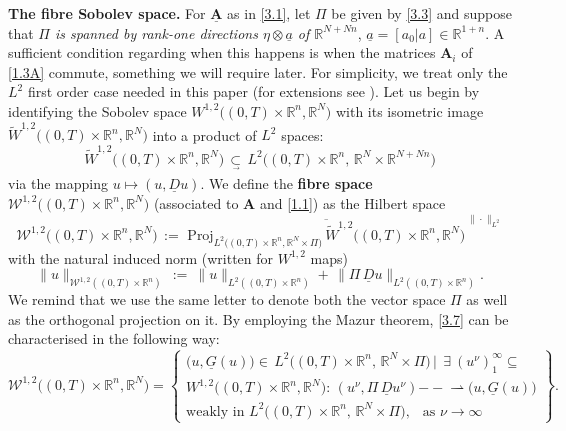 \documentclass{amsart}
\theoremstyle{definition}
\numberwithin{equation}{section}
\begin{document}
{\noindent} \textbf{The fibre Sobolev space.}  For ${\underline{\textbf{A}}}$ as in \eqref{3.1}, let $\Pi$ be given by \eqref{3.3} and suppose that \emph{$\Pi$ is spanned by rank-one directions $\eta {\otimes} \underline{a}$ of ${\mathbb{R}}^{N +Nn}$}, $\underline{a}=[a_0|a]\in {\mathbb{R}}^{1+n}$. A sufficient condition regarding when this happens is when the matrices ${\textbf{A}}_i$ of \eqref{1.3A} commute, something we will require later. For simplicity, we treat only the $L^2$ first order case needed in this paper (for extensions see \cite{K8}). Let us begin by identifying the Sobolev space $W^{1,2}\big((0,T)\!{\times}\! {\mathbb{R}}^n,{\mathbb{R}}^N\big)$ with its isometric image $\tilde{W}^{1,2}\big((0,T)\!{\times}\! {\mathbb{R}}^n,{\mathbb{R}}^N\big)$ into a product of $L^2$ spaces:
\[
\tilde{W}^{1,2}\Big((0,T)\!{\times}\! {\mathbb{R}}^n,{\mathbb{R}}^N\Big)\, \underset{\, ^{\rightarrow}}{\subset} \, L^2\Big((0,T)\!{\times}\! {\mathbb{R}}^n,\, {\mathbb{R}}^N \! {\times} {\mathbb{R}}^{N+Nn}\Big)
\]
via the mapping $u\mapsto(u,{\underline{D}} u)$. We define the \textbf{fibre space} $\mathscr{W}^{1,2}\big( (0,T)\!{\times}\! {\mathbb{R}}^n,{\mathbb{R}}^N \big)$ (associated to ${\textbf{A}}$ and \eqref{1.1}) as the Hilbert space
\begin{equation} \label{3.7}
\mathscr{W}^{1,2} \Big((0,T)\!{\times}{\mathbb{R}}^n,{\mathbb{R}}^N\Big)\, :=\, \overline{\, \text{Proj}_{ L^2\big((0,T){\times}  {\mathbb{R}}^n,{\mathbb{R}}^N {\times} \Pi \big) }\,  \tilde{W}^{1,2} \Big((0,T)\!{\times}{\mathbb{R}}^n,{\mathbb{R}}^N\Big) \, }^{\|\cdot\|_{ L^2} }
\end{equation}
with the natural induced norm (written for $W^{1,2}$ maps)
\[
\|u\|_{\mathscr{W}^{1,2}((0,T){\times} {\mathbb{R}}^n )} \, :=\ \|u \|_{L^2((0,T){\times} {\mathbb{R}}^n)}+\, \big\|\Pi\, {\underline{D}} u \big\|_{L^2((0,T){\times}{\mathbb{R}}^n)}.
\]
We remind that we use the same letter to denote both the vector space $\Pi$ as well as the orthogonal projection on it. By employing the Mazur theorem,  \eqref{3.7} can be characterised in the following way:
\[
\mathscr{W}^{1,2}  \Big((0,T) {\times} {\mathbb{R}}^n,{\mathbb{R}}^N\Big) = \left\{ 
\begin{array}{l}
 \big(u,  \underline{G}  (u)\big) \in\, L^2\Big( (0,T)\!{\times}\! {\mathbb{R}}^n,\, {\mathbb{R}}^N\! {\times} \Pi \Big) \, \Big|\  \ \exists\ (u^\nu)_1^\infty   {\subseteq}  \\
W^{1,2} \Big((0,T)\!{\times} {\mathbb{R}}^n,{\mathbb{R}}^N\Big) :\,  \left(u^\nu , \Pi\, {\underline{D}} u^\nu \right) {-\!\!\!\!-\!\!\!\!\rightharpoonup} \big(u, \underline{G} (u) \big)\\
 \text{weakly in }L^2\Big((0,T)\!{\times} {\mathbb{R}}^n,\, {\mathbb{R}}^N\!{\times} \Pi\Big),\ \ \text{ as }\nu {\rightarrow}\infty  
\end{array}
\!\!\right\}.
\]
\end{document}
